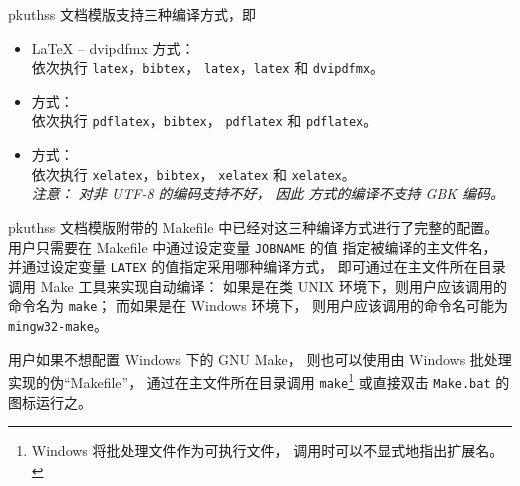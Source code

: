 	pkuthss 文档模版支持三种编译方式，即
	\begin{itemize}
		\item \LaTeX{} -- dvipdfmx 方式：\\
			依次执行 \verb|latex|，\verb|bibtex|，%
			\verb|latex|，\verb|latex| 和 \verb|dvipdfmx|。
		\item {} 方式：\\
			依次执行 \verb|pdflatex|，\verb|bibtex|，%
			\verb|pdflatex| 和 \verb|pdflatex|。
		\item {} 方式：\\
			依次执行 \verb|xelatex|，\verb|bibtex|，%
			\verb|xelatex| 和 \verb|xelatex|。\\
			\emph{%
				注意： 对非 UTF-8 的编码支持不好，
				因此  方式的编译不支持 GBK 编码。
			}
	\end{itemize}

	pkuthss 文档模版附带的 Makefile 中已经对这三种编译方式进行了完整的配置。
	用户只需要在 Makefile 中通过设定变量 \verb|JOBNAME| 的值%
	指定被编译的主文件名，
	并通过设定变量 \verb|LATEX| 的值指定采用哪种编译方式，
	即可通过在主文件所在目录调用 Make 工具来实现自动编译：
	如果是在类 UNIX 环境下，则用户应该调用的命令名为 \verb|make|；
	而如果是在 Windows 环境下，
	则用户应该调用的命令名可能为 \verb|mingw32-make|。

	用户如果不想配置 Windows 下的 GNU Make，
	则也可以使用由 Windows 批处理实现的伪“Makefile”，
	通过在主文件所在目录调用 \verb|make|\footnote{%
		Windows 将批处理文件作为可执行文件，
		调用时可以不显式地指出扩展名。%
	} 或直接双击 \verb|Make.bat| 的图标运行之。


